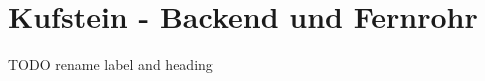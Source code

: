 \section{Kufstein - Backend und Fernrohr}\label{sec:kufstein}

TODO rename label and heading

\cite{anno4j1}